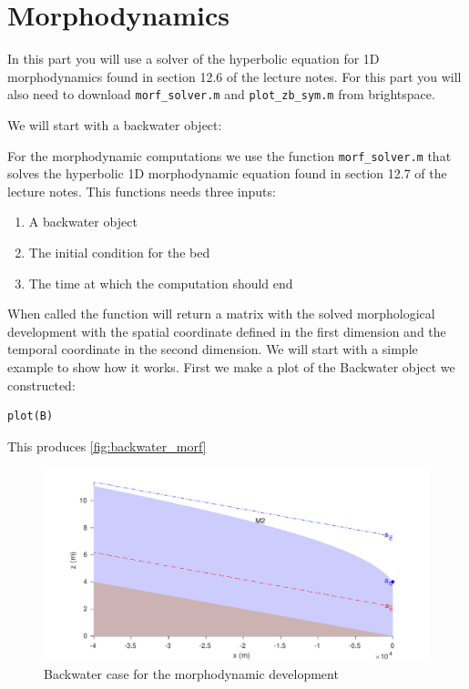 \documentclass[a4paper]{article}
\begin{document}
\section{Morphodynamics}
In this part you will use a solver of the hyperbolic equation for 1D morphodynamics found in section 12.6 of the lecture notes. For this part you will also need to download \lstinline{morf_solver.m} and \lstinline{plot_zb_sym.m} from brightspace.

We will start with a backwater object:


For the morphodynamic computations we use the function \lstinline{morf_solver.m} that solves the hyperbolic 1D morphodynamic equation found in section 12.7 of the lecture notes.
This functions needs three inputs:
\begin{enumerate}
  \item A backwater object
  \item The initial condition for the bed
  \item The time at which the computation should end
\end{enumerate}
When called the function will return a matrix with the solved morphological development with the spatial coordinate defined in the first dimension and the temporal coordinate in the second dimension.
We will start with a simple example to show how it works. 
First we make a plot of the Backwater object we constructed:
\begin{lstlisting}
plot(B)
\end{lstlisting}
This produces \autoref{fig:backwater_morf}
\begin{figure}[ht]
  \centering
  \includegraphics[width=\linewidth]{matlab/backwater_morf}
  \caption{Backwater case for the morphodynamic development}
  \label{fig:backwater_morf}
\end{figure}
\end{document}
